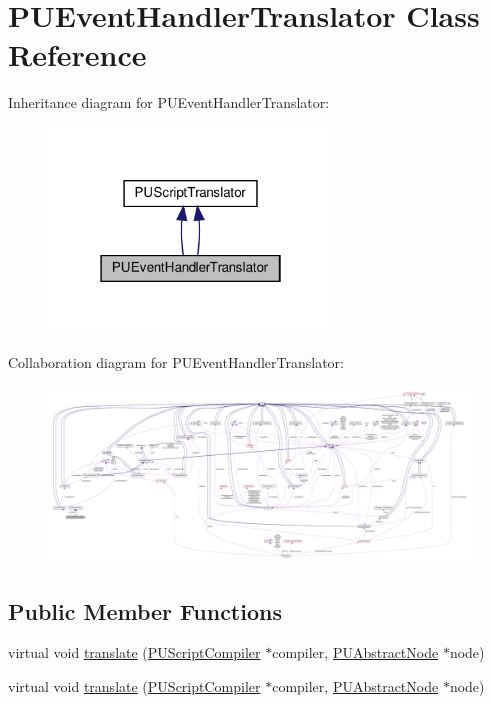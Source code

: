 \hypertarget{classPUEventHandlerTranslator}{}\section{P\+U\+Event\+Handler\+Translator Class Reference}
\label{classPUEventHandlerTranslator}


Inheritance diagram for P\+U\+Event\+Handler\+Translator\+:
\nopagebreak
\begin{figure}[H]
\begin{center}
\leavevmode
\includegraphics[width=214pt]{classPUEventHandlerTranslator__inherit__graph}
\end{center}
\end{figure}


Collaboration diagram for P\+U\+Event\+Handler\+Translator\+:
\nopagebreak
\begin{figure}[H]
\begin{center}
\leavevmode
\includegraphics[width=350pt]{classPUEventHandlerTranslator__coll__graph}
\end{center}
\end{figure}
\subsection*{Public Member Functions}
\begin{DoxyCompactItemize}
\item 
virtual void \hyperlink{classPUEventHandlerTranslator_acea6af37c14e6417ae0d3a67c35d7d46}{translate} (\hyperlink{classPUScriptCompiler}{P\+U\+Script\+Compiler} $\ast$compiler, \hyperlink{classPUAbstractNode}{P\+U\+Abstract\+Node} $\ast$node)
\item 
virtual void \hyperlink{classPUEventHandlerTranslator_af36fbdee9013a8ad245279a382773c2e}{translate} (\hyperlink{classPUScriptCompiler}{P\+U\+Script\+Compiler} $\ast$compiler, \hyperlink{classPUAbstractNode}{P\+U\+Abstract\+Node} $\ast$node)
\end{DoxyCompactItemize}
